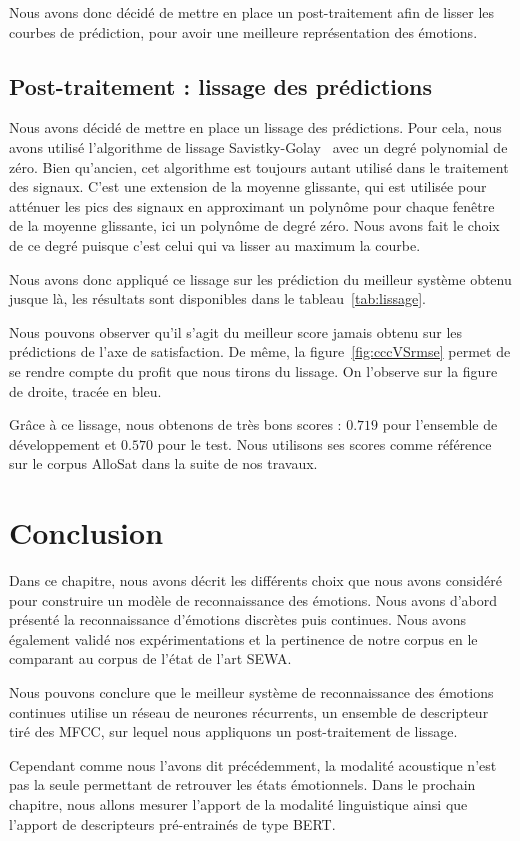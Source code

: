 

Nous avons donc décidé de mettre en place un post-traitement afin de lisser les courbes de prédiction, pour avoir une meilleure représentation des émotions.

\subsection{Post-traitement : lissage des prédictions}
\label{sec:5.5.3}
Nous avons décidé de mettre en place un lissage des prédictions. Pour cela, nous avons utilisé l'algorithme de lissage Savistky-Golay~\cite{Savitzky1964} avec un degré polynomial de zéro. Bien qu'ancien, cet algorithme est toujours autant utilisé dans le traitement des signaux. C'est une extension de la moyenne glissante, qui est utilisée pour atténuer les pics des signaux en approximant un polynôme pour chaque fenêtre de la moyenne glissante, ici un polynôme de degré zéro. Nous avons fait le choix de ce degré puisque c'est celui qui va lisser au maximum la courbe.

Nous avons donc appliqué ce lissage sur les prédiction du meilleur système obtenu jusque là, les résultats sont disponibles dans le tableau~\ref{tab:lissage}.



Nous pouvons observer qu'il s'agit du meilleur score jamais obtenu sur les prédictions de l'axe de satisfaction. De même, la figure~\ref{fig:cccVSrmse} permet de se rendre compte du profit que nous tirons du lissage. On l'observe sur la figure de droite, tracée en bleu.

Grâce à ce lissage, nous obtenons de très bons scores : $0.719$ pour l'ensemble de développement et $0.570$ pour le test. Nous utilisons ses scores comme référence sur le corpus AlloSat dans la suite de nos travaux.%


\section{Conclusion}
Dans ce chapitre, nous avons décrit les différents choix que nous avons considéré pour construire un modèle de reconnaissance des émotions. Nous avons d'abord présenté la reconnaissance d'émotions discrètes puis continues. Nous avons également validé nos expérimentations et la pertinence de notre corpus en le comparant au corpus de l'état de l'art SEWA.

Nous pouvons conclure que le meilleur système de reconnaissance des émotions continues utilise un réseau de neurones récurrents, un ensemble de descripteur tiré des MFCC, sur lequel nous appliquons un post-traitement de lissage.

Cependant comme nous l'avons dit précédemment, la modalité acoustique n'est pas la seule permettant de retrouver les états émotionnels. Dans le prochain chapitre, nous allons mesurer l'apport de la modalité linguistique ainsi que l'apport de descripteurs pré-entrainés de type BERT.
